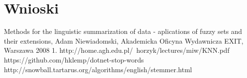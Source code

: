 \documentclass{classrep}
\begin{document}
	
\section{Wnioski}
	

\begin{thebibliography}{}
Methods for the linguistic summarization of data - aplications of fuzzy sets and their extensions, Adam Niewiadomski, Akademicka Oficyna Wydawnicza EXIT, Warszawa 2008
1. http://home.agh.edu.pl/~horzyk/lectures/miw/KNN.pdf
https://github.com/hklemp/dotnet-stop-words
http://snowball.tartarus.org/algorithms/english/stemmer.html
\end{thebibliography}
\end{document}
